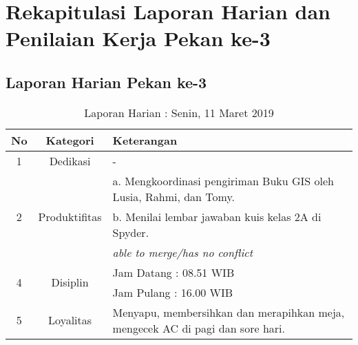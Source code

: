 \section{Rekapitulasi Laporan Harian dan Penilaian Kerja Pekan ke-3}

\subsection{Laporan Harian Pekan ke-3}

\begin{table}[htp]
\begin{center}
\caption{Laporan Harian : Senin, 11 Maret 2019}
\label{tab:lh110319}
\begin{tabularx}{\textwidth}{|l|l|X|}
\hline
\multicolumn{1}{|c|}{\textbf{No}} & \multicolumn{1}{c|}{\textbf{Kategori}} & \textbf{Keterangan} \\ \hline
\multicolumn{1}{|c|}{\multirow{1}{*}{1}} & \multicolumn{1}{c|}{\multirow{1}{*}{\parbox{2.5cm}{Dedikasi}}}
& - \\
\hline
\multicolumn{1}{|c|}{\multirow{3}{*}{2}} & \multicolumn{1}{c|}{\multirow{3}{*}{\parbox{2.5cm}{Produktifitas}}}
& a. Mengkoordinasi pengiriman Buku GIS oleh Lusia, Rahmi, dan Tomy.\\
\multicolumn{1}{|c|}{\multirow{1}{*}{}} & \multicolumn{1}{c|}{\multirow{1}{*}{\parbox{2.5cm}{}}}
& b. Menilai lembar jawaban kuis kelas 2A di Spyder.\\
\hline
\multicolumn{1}{|c|}{\multirow{1}{*}{3}} & \multicolumn{1}{c|}{\multirow{1}{*}{\parbox{2.5cm}{Integritas}}}
& \textit{able to merge/has no conflict} \\
\hline
\multicolumn{1}{|c|}{\multirow{2}{*}{4}} & \multicolumn{1}{c|}{\multirow{2}{*}{\parbox{2.5cm}{Disiplin}}}
& Jam Datang : 08.51 WIB \\
\multicolumn{1}{|c|}{\multirow{1}{*}{}} & \multicolumn{1}{c|}{\multirow{1}{*}{\parbox{2.5cm}{}}}
& Jam Pulang : 16.00 WIB \\
\hline
\multicolumn{1}{|c|}{\multirow{2}{*}{5}} & \multicolumn{1}{c|}{\multirow{2}{*}{\parbox{2.5cm}{Loyalitas}}}
& Menyapu, membersihkan dan merapihkan meja, mengecek AC di pagi dan sore hari.\\
\hline
\end{tabularx}
\end{center}
\end{table}

